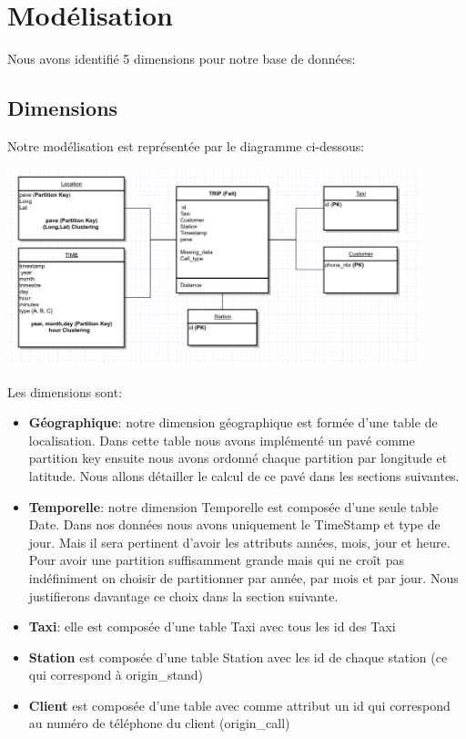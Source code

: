 \documentclass[]{report}
\begin{document}
	
	\section{Modélisation}
	Nous avons identifié 5 dimensions pour notre base de données:
	\subsection{Dimensions}
	Notre modélisation est représentée par le diagramme ci-dessous:
	\begin{center}
		\includegraphics[width=120mm]{Figures/modele.png}
		\label{fig:y=6}
	\end{center}
	Les dimensions sont:
	\begin{itemize}
		\item \textbf{Géographique}: notre dimension géographique est formée d'une table de localisation. Dans cette table nous avons implémenté un pavé comme partition key ensuite nous avons ordonné chaque partition par longitude et latitude. Nous allons détailler le calcul de ce pavé dans les sections suivantes.
		\item \textbf{Temporelle}: notre dimension Temporelle est composée d'une seule table Date. Dans nos données nous avons uniquement le TimeStamp et type de jour. Mais il sera pertinent d'avoir les attributs années, mois, jour et heure. Pour avoir une partition suffisamment grande mais qui ne croît pas indéfiniment on choisir de partitionner par année, par mois et par jour. Nous justifierons davantage ce choix dans la section suivante.
		\item \textbf{Taxi}: elle est composée d'une table Taxi avec tous les id des Taxi
		\item \textbf{Station} est composée d'une table Station avec les id de chaque station (ce qui correspond à origin\_stand)
		\item \textbf{Client}  est composée d'une table avec comme attribut un id qui correspond au numéro de téléphone du client (origin\_call)
		
	\end{itemize}
\end{document}
